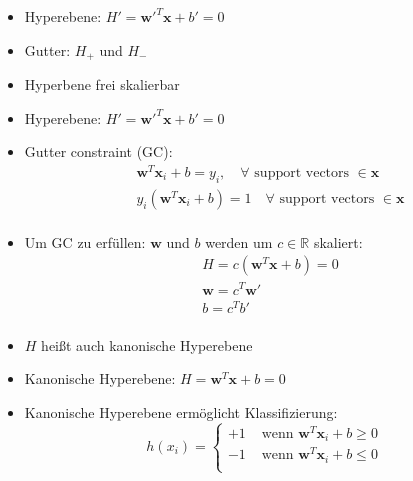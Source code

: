 \begin{frame}
     {
        \begin{itemize}
            \item Hyperebene: $ H' = \boldsymbol{w}'^T \boldsymbol{x} + b' = 0 $
            \item Gutter: $H_+$ und $H_-$
            \item Hyperbene frei skalierbar
        \end{itemize}
    } {
        \begin{itemize}
            \item Hyperebene: $ H' = \boldsymbol{w}'^T \boldsymbol{x} + b' = 0 $
            \item Gutter constraint (GC):
                \begin{align*}
                    & \boldsymbol{w}^T \boldsymbol{x}_i + b = y_i, \quad \forall \text{ support vectors } \in \boldsymbol{x} \\
                    & y_i ( \boldsymbol{w}^T \boldsymbol{x}_i + b ) = 1 \quad \forall \text{ support vectors } \in \boldsymbol{x} \\
                \end{align*}
            \item Um GC zu erfüllen: $ \boldsymbol{w} $ und $b$ werden um $ c \in \mathbb{R} $ skaliert:
                \begin{align*}
                    & H = c ( \boldsymbol{w}^T \boldsymbol{x} + b ) = 0 \\
                    & \boldsymbol{w} = c^T \boldsymbol{w}' \\
                    & b = c^T b' \\
                \end{align*}
            \item $H$ heißt auch kanonische Hyperebene
        \end{itemize}
    } {
        \begin{itemize}
            \item Kanonische Hyperebene: $ H = \boldsymbol{w}^T \boldsymbol{x} + b = 0 $
            \item Kanonische Hyperebene ermöglicht Klassifizierung:
                \begin{equation*}
                    h(x_i) = \begin{cases}
                        +1 & \text{ wenn } \boldsymbol{w}^T \boldsymbol{x}_i + b \geq 0 \\
                        -1 & \text{ wenn } \boldsymbol{w}^T \boldsymbol{x}_i + b \leq 0 \\
                    \end{cases}
                \end{equation*}
        \end{itemize}
    }
\end{frame}

